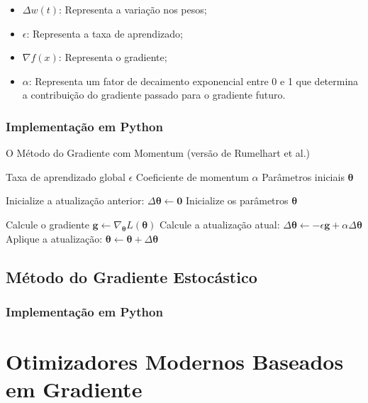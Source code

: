 \begin{itemize}
    \item $\Delta w(t)$: Representa a variação nos pesos;
    \item $\epsilon$: Representa a taxa de aprendizado;
    \item $\nabla f(x)$: Representa o gradiente;
    \item $\alpha$: Representa um fator de decaimento exponencial entre 0 e 1 que determina a contribuição do gradiente passado para o gradiente futuro.
\end{itemize}

\subsubsection{Implementação em Python}

\begin{algorithm}[H]
\caption{O Método do Gradiente com Momentum (versão de Rumelhart et al.)}
\label{alg:momentum_rumelhart}
\begin{algorithmic}[1]
\Require Taxa de aprendizado global $\epsilon$
\Require Coeficiente de momentum $\alpha$
\Require Parâmetros iniciais $\boldsymbol{\theta}$

\State Inicialize a atualização anterior: $\Delta\boldsymbol{\theta} \gets \mathbf{0}$
\State Inicialize os parâmetros $\boldsymbol{\theta}$

    \State Calcule o gradiente $\mathbf{g} \gets \nabla_{\boldsymbol{\theta}} L(\boldsymbol{\theta})$
    \State Calcule a atualização atual: $\Delta\boldsymbol{\theta} \gets -\epsilon \mathbf{g} + \alpha \Delta\boldsymbol{\theta}$
    \State Aplique a atualização: $\boldsymbol{\theta} \gets \boldsymbol{\theta} + \Delta\boldsymbol{\theta}$
\EndWhile
\end{algorithmic}
\end{algorithm}

\subsection{Método do Gradiente Estocástico}

\subsubsection{Implementação em Python}

\section{Otimizadores Modernos Baseados em Gradiente}

